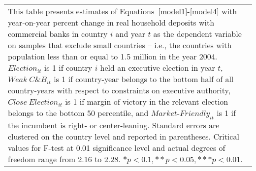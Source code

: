 \begin{longtable}{m{5cm}*{12}{c}}
\bottomrule                                          \multicolumn{13}{m{\linewidth}}{\footnotesize This table presents estimates of Equations~\eqref{model1}-\eqref{model4} with year-on-year percent change in real household deposits with commercial banks in country $ i $ and year $ t $ as the dependent variable on samples that exclude small countries -- i.e., the countries with population less than or equal to 1.5 million in the year 2004. $ Election_{it} $ is 1 if country $ i $ held an executive election in year $ t $, $ Weak\ C\&B_{it} $ is 1 if country-year belongs to the bottom half of all country-years with respect to constraints on executive authority, $ Close\ Election_{it} $ is 1 if margin of victory in the relevant election belongs to the bottom 50 percentile, and $ Market\text{-}Friendly_{it} $ is 1 if the incumbent is right- or center-leaning. Standard errors are clustered on the country level and reported in parentheses. Critical values for F-test at 0.01 significance level and actual degrees of freedom range from 2.16 to 2.28. \( * p<0.1, ** p<0.05, *** p<0.01 \). }\\                                          \end{longtable}
